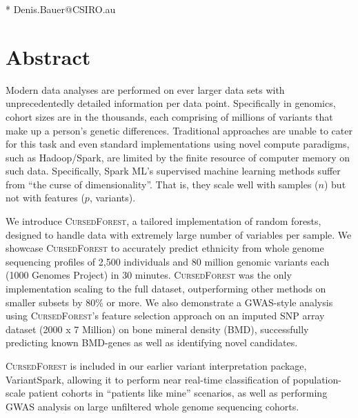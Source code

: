 \documentclass[10pt,letterpaper]{article}
\newcommand{\cursedforest}{\textsc{CursedForest}\xspace}
\begin{document}
\begin{flushleft}



* Denis.Bauer@CSIRO.au
\end{flushleft}


\section{Abstract}
Modern data analyses are performed on ever larger data sets with unprecedentedly detailed information per data point. Specifically in
genomics, cohort sizes are in the thousands, each comprising of millions of variants that make up a person's genetic
differences. Traditional approaches are unable to cater for this task and even standard implementations using novel
compute paradigms, such as Hadoop/Spark, are limited by the finite resource of computer memory on such
data. Specifically, Spark ML's supervised machine learning methods suffer from ``the curse of dimensionality''. That is,
they scale well with samples ($n$) but not with features ($p$, variants).

We introduce \cursedforest, a tailored implementation of random forests, designed to handle data with extremely large
number of variables per sample. We showcase \cursedforest to accurately predict ethnicity from whole genome sequencing
profiles of 2,500 individuals and 80 million genomic variants each (1000 Genomes Project) in 30 minutes. \cursedforest
was the only implementation scaling to the full dataset, outperforming other methods on smaller subsets by 80\% or
more. We also demonstrate a GWAS-style analysis using \cursedforest's feature selection approach on an imputed SNP array
dataset (2000 x 7 Million) on bone mineral density (BMD), successfully predicting known BMD-genes as well as identifying
novel candidates.

\cursedforest is included in our earlier variant interpretation package, VariantSpark, allowing it to perform near
real-time classification of population-scale patient cohorts in ``patients like mine'' scenarios, as well as performing
GWAS analysis on large unfiltered whole genome sequencing cohorts.
\end{document}
